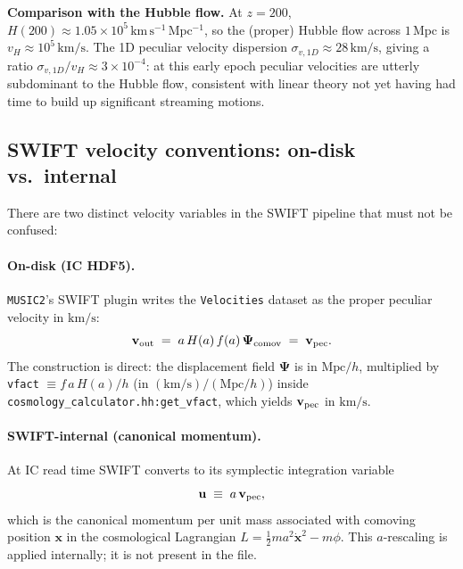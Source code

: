 \documentclass[12pt]{article}
\newcommand{\bx}{\mathbf{x}}
\newcommand{\bPsi}{\boldsymbol{\Psi}}
\newcommand{\bv}{\mathbf{v}}
\begin{document}
\noindent\textbf{Comparison with the Hubble flow.}  At $z = 200$,
$H(200) \approx 1.05\times10^5\,\mathrm{km\,s^{-1}\,Mpc^{-1}}$, so
the (proper) Hubble flow across $1\,\mathrm{Mpc}$ is
$v_H \approx 10^5\,\mathrm{km/s}$.  The 1D peculiar velocity
dispersion $\sigma_{v,1D} \approx 28\,\mathrm{km/s}$, giving a ratio
$\sigma_{v,1D}/v_H \approx 3\times10^{-4}$: at this early epoch
peculiar velocities are utterly subdominant to the Hubble flow,
consistent with linear theory not yet having had time to build up
significant streaming motions.

\subsection{SWIFT velocity conventions: on-disk vs.~internal}
\label{sec:swift_vel}

There are two distinct velocity variables in the SWIFT pipeline that
must not be confused:

\paragraph{On-disk (IC HDF5).}
\texttt{MUSIC2}'s SWIFT plugin writes the \texttt{Velocities} dataset as
the proper peculiar velocity in $\mathrm{km/s}$:
%
\begin{equation}
  \bv_{\rm out} \;=\; a\,H(a)\,f(a)\,\bPsi_{\rm comov}
              \;=\; \bv_{\rm pec}.
  \label{eq:vout}
\end{equation}
%
The construction is direct: the displacement field $\bPsi$ is in
$\mathrm{Mpc}/h$, multiplied by
\texttt{vfact} $\equiv f\,a\,H(a)/h$ (in $\mathrm{(km/s)}/(\mathrm{Mpc}/h)$) inside
\texttt{cosmology\_calculator.hh:get\_vfact}, which yields
$\bv_{\rm pec}$ in $\mathrm{km/s}$.

\paragraph{SWIFT-internal (canonical momentum).}
At IC read time SWIFT converts to its symplectic integration variable
%
\begin{equation}
  \mathbf{u} \;\equiv\; a\,\bv_{\rm pec},
\end{equation}
%
which is the canonical momentum per unit mass associated with comoving
position $\bx$ in the cosmological Lagrangian
$L = \tfrac12 m a^2 \dot{\bx}^2 - m\phi$.  This $a$-rescaling is
applied internally; it is not present in the file.
\end{document}
